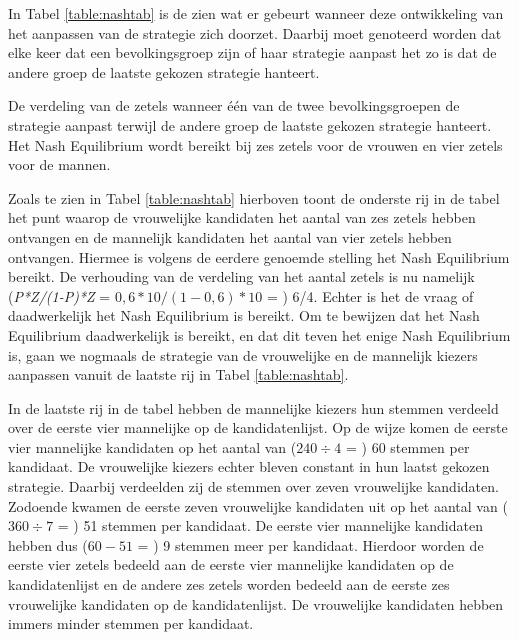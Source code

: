 In Tabel \ref{table:nashtab} is de zien wat er gebeurt wanneer deze ontwikkeling van het aanpassen van de strategie zich doorzet. Daarbij moet genoteerd worden dat elke keer dat een bevolkingsgroep zijn of haar strategie aanpast het zo is dat de andere groep de laatste gekozen strategie hanteert. 


\begin{table}[H]
\centering

		

			\caption{De verdeling van de zetels wanneer één van de twee bevolkingsgroepen de strategie aanpast terwijl de andere groep de laatste gekozen strategie hanteert. Het Nash Equilibrium wordt bereikt bij zes zetels voor de vrouwen en vier zetels voor de mannen.}
\label{table:nashtab} 
\end{table}

Zoals te zien in Tabel \ref{table:nashtab} hierboven toont de onderste rij in de tabel het punt waarop de vrouwelijke kandidaten het aantal van zes zetels hebben ontvangen en de mannelijk kandidaten het aantal van vier zetels hebben ontvangen. Hiermee is volgens de eerdere genoemde stelling het Nash Equilibrium bereikt. De verhouding van de verdeling van het aantal zetels is nu namelijk (\textit{P*Z/(1-P)*Z} = $0,6*10/(1-0,6)*10$ = ) 6/4. Echter is het de vraag of daadwerkelijk het Nash Equilibrium is bereikt. Om te bewijzen dat het Nash Equilibrium daadwerkelijk is bereikt, en dat dit teven het enige Nash Equilibrium is, gaan we nogmaals de strategie van de vrouwelijke en de mannelijk kiezers aanpassen vanuit de laatste rij in Tabel \ref{table:nashtab}. 

In de laatste rij in de tabel hebben de mannelijke kiezers hun stemmen verdeeld over de eerste vier mannelijke op de kandidatenlijst. Op de wijze komen de eerste vier mannelijke kandidaten op het aantal van ($240\div4$ = ) 60 stemmen per kandidaat. De vrouwelijke kiezers echter bleven constant in hun laatst gekozen strategie. Daarbij verdeelden zij de stemmen over zeven vrouwelijke kandidaten. Zodoende kwamen de eerste zeven vrouwelijke kandidaten uit op het aantal van ($360\div7$ = ) 51 stemmen per kandidaat. De eerste vier mannelijke kandidaten hebben dus ($60-51$ = ) 9 stemmen meer per kandidaat. Hierdoor worden de eerste vier zetels bedeeld aan de eerste vier mannelijke kandidaten op de kandidatenlijst en de andere zes zetels worden bedeeld aan de eerste zes vrouwelijke kandidaten op de kandidatenlijst. De vrouwelijke kandidaten hebben immers minder stemmen per kandidaat. 

